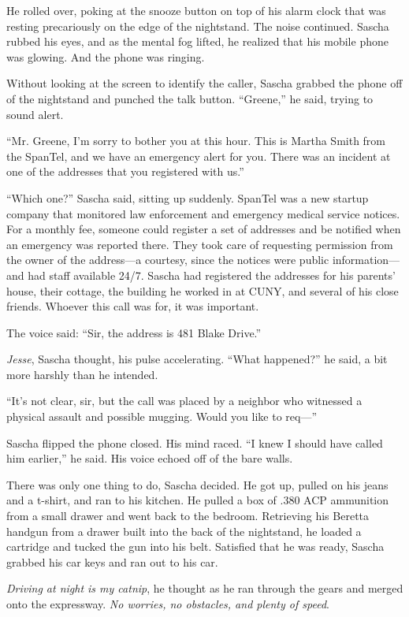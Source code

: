 \documentclass[12pt]{book}
\begin{document}
He rolled over, poking at the snooze button on top of his alarm clock that was resting precariously on the edge of the nightstand.  The noise continued.  Sascha rubbed his eyes, and as the mental fog lifted, he realized that his mobile phone was glowing.  And the phone was ringing.

Without looking at the screen to identify the caller, Sascha grabbed the phone off of the nightstand and punched the talk button.  ``Greene,'' he said, trying to sound alert.

``Mr. Greene, I'm sorry to bother you at this hour.  This is Martha Smith from the SpanTel, and we have an emergency alert for you.  There was an incident at one of the addresses that you registered with us.''

``Which one?'' Sascha said, sitting up suddenly.  SpanTel was a new startup company that monitored law enforcement and emergency medical service notices.  For a monthly fee, someone could register a set of addresses and be notified when an emergency was reported there.  They took care of requesting permission from the owner of the address---a courtesy, since the notices were public information---and had staff available 24/7.  Sascha had registered the addresses for his parents' house, their cottage, the building he worked in at CUNY, and several of his close friends.  Whoever this call was for, it was important.

The voice said: ``Sir, the address is 481 Blake Drive.''

\emph{Jesse}, Sascha thought, his pulse accelerating.  ``What happened?'' he said, a bit more harshly than he intended.

``It's not clear, sir, but the call was placed by a neighbor who witnessed a physical assault and possible mugging.  Would you like to req---''

Sascha flipped the phone closed.  His mind raced.  ``I knew I should have called him earlier,'' he said.  His voice echoed off of the bare walls.

There was only one thing to do, Sascha decided.  He got up, pulled on his jeans and a t-shirt, and ran to his kitchen.  He pulled a box of .380 ACP ammunition from a small drawer and went back to the bedroom.  Retrieving his Beretta handgun from a drawer built into the back of the nightstand, he loaded a cartridge and tucked the gun into his belt.  Satisfied that he was ready, Sascha grabbed his car keys and ran out to his car.

\emph{Driving at night is my catnip}, he thought as he ran through the gears and merged onto the expressway.  \emph{No worries, no obstacles, and plenty of speed}.
\end{document}
